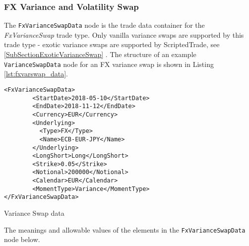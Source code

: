 \subsubsection{FX Variance and Volatility Swap}
\label{SubSectionFxVarianceSwap}

The \lstinline!FxVarianceSwapData! node is the trade data container for the \emph{FxVarianceSwap} trade type. Only vanilla variance swaps are supported by this trade type - exotic variance swaps are supported by ScriptedTrade\ifdefined\OrePlusDoc, see  \ref{SubSectionExoticVarianceSwap} \else. \fi
The structure of an example \lstinline!VarianceSwapData! node for an FX variance swap is shown in Listing \ref{lst:fxvarswap_data}.

\begin{listing}[H]
	\begin{verbatim}
<FxVarianceSwapData>
        <StartDate>2018-05-10</StartDate>
        <EndDate>2018-11-12</EndDate>
        <Currency>EUR</Currency>
        <Underlying>
          <Type>FX</Type>
          <Name>ECB-EUR-JPY</Name>
        </Underlying>
        <LongShort>Long</LongShort>
        <Strike>0.05</Strike>
        <Notional>200000</Notional>
        <Calendar>EUR</Calendar>
        <MomentType>Variance</MomentType>
</FxVarianceSwapData>
	\end{verbatim}
	\caption{Variance Swap data}
	\label{lst:fxvarswap_data}
\end{listing}

The meanings and allowable values of the elements in the \lstinline!FxVarianceSwapData! node below.

